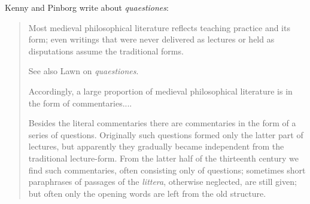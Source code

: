 \documentclass{article}
\theoremstyle{definition}
\begin{document}
 Kenny and Pinborg \cite[pp.~29--30]{kenny} write about {\em quaestiones}:
 \begin{quote}
 Most medieval philosophical literature reflects teaching practice and its form; even writings that were never delivered as lectures
 or held as disputations assume the traditional forms.
 
 See also Lawn \cite{lawn} on {\em quaestiones}.
 
 Accordingly, a large proportion of medieval philosophical literature is in the form of commentaries....

  Besides the literal commentaries there are commentaries in the form of a series of questions. Originally
 such questions formed only the latter part of lectures, but apparently they gradually became independent from the traditional
 lecture-form. From the latter half of the thirteenth century we find such commentaries, often consisting
 only of questions; sometimes short paraphrases of passages of the {\em littera}, otherwise neglected, are still
 given; but often only the opening words are left from the old structure.
 \end{quote}
 
\end{document}
